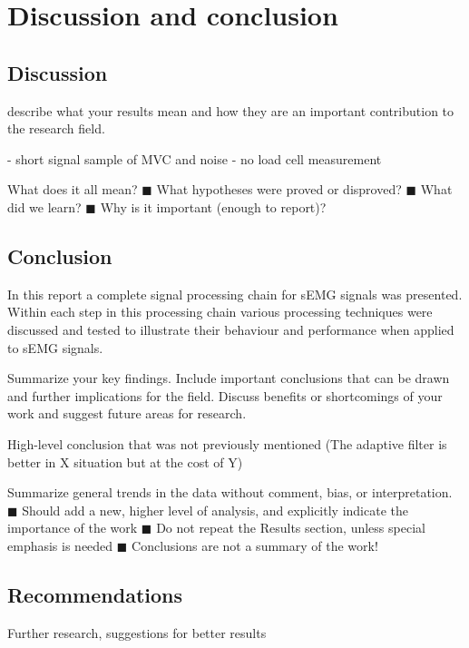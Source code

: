 \chapter{Discussion and conclusion}
\section{Discussion}


describe what your results mean and how they are an important contribution to the research field.

- short signal sample of MVC and noise
- no load cell measurement


What does it all mean?
◼ What hypotheses were proved or disproved?
◼ What did we learn?
◼ Why is it important (enough to report)?
\section{Conclusion}
In this report a complete signal processing chain for sEMG signals was presented. Within each step in this processing chain various processing techniques were discussed and tested to illustrate their behaviour and performance when applied to sEMG signals. 



Summarize your key findings. Include important conclusions that can be drawn and further implications for the field. Discuss benefits or shortcomings of your work and suggest future areas for research.

High-level conclusion that was not previously mentioned (The adaptive filter is better in X situation but at the cost of Y)

Summarize general trends in the data without comment, bias, or interpretation.
◼ Should add a new, higher level of analysis, and explicitly indicate the importance
of the work
◼ Do not repeat the Results section, unless special emphasis is needed
◼ Conclusions are not a summary of the work!

\section{Recommendations}
Further research, suggestions for better results
